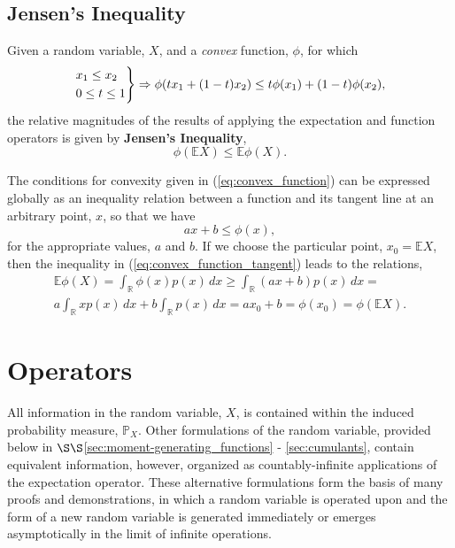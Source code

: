 \documentclass[12pt, twoside, draft]{article}
\begin{document}
\subsection{Jensen's Inequality}\label{sec:Jensens_inequality}
Given a random variable, $X$, and a \textit{convex} function, $\phi$, for which 
\begin{equation}\label{eq:convex_function}
\begin{rcases}
x_1 \leq x_2 \\
0 \leq t \leq 1
\end{rcases} \Rightarrow \phi(tx_1 + (1-t)x_2) \leq t\phi(x_1) + (1-t)\phi(x_2),
\end{equation}
the relative magnitudes of the results of applying the expectation and function operators is given by \textbf{Jensen's Inequality},
\begin{equation}
\phi(\mathbb{E}X) \leq \mathbb{E}\phi(X).
\end{equation}

The conditions for convexity given in (\ref{eq:convex_function}) can be expressed globally as an inequality relation between a function and its tangent line at an arbitrary point, $x$, so that we have
\begin{equation}\label{eq:convex_function_tangent}
ax + b \leq \phi(x),
\end{equation}
for the appropriate values, $a$ and $b$.  If we choose the particular point, $x_0 = \mathbb{E}X$, then the inequality in (\ref{eq:convex_function_tangent}) leads to the relations,
\begin{multline}
\mathbb{E}\phi(X) = \int_\mathbb{R} \phi(x) p(x) \,dx \geq \int_\mathbb{R} (ax + b) p(x)\, dx = \\  a\int_\mathbb{R} xp(x)\,dx + b\int_\mathbb{R} p(x)\, dx = a x_0 + b = \phi(x_0) = \phi(\mathbb{E}X).
\end{multline}

\section{Operators}\label{sec:operators}
All information in the random variable, $X$, is contained within the induced probability measure, $\mathbb{P}_X$.  Other formulations of the random variable, provided below in $\S\S$\ref{sec:moment-generating_functions} - \ref{sec:cumulants}, contain equivalent information, however, organized as countably-infinite applications of the expectation operator.  These alternative formulations form the basis of many proofs and demonstrations, in which a random variable is operated upon and the form of a new random variable is generated immediately or emerges asymptotically in the limit of infinite operations.
\end{document}
